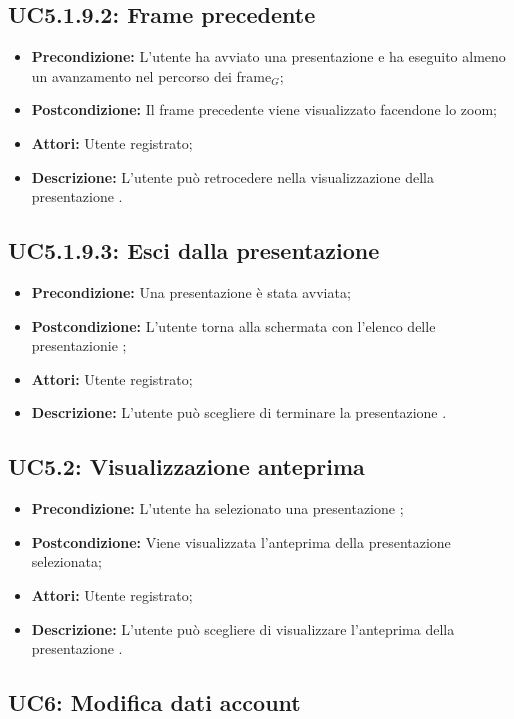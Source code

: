 \subsection{ UC5.1.9.2: Frame precedente}

\begin{itemize}
	\item \textbf{Precondizione:} L'utente ha avviato una presentazione e ha eseguito almeno un avanzamento nel percorso dei frame$_G$;
	\item \textbf{Postcondizione:} Il frame precedente viene visualizzato facendone lo zoom;
	\item \textbf{Attori:} Utente registrato;
	\item \textbf{Descrizione:} L'utente può retrocedere nella visualizzazione della presentazione .
\end{itemize}
\subsection{ UC5.1.9.3: Esci dalla presentazione }

\begin{itemize}
	\item \textbf{Precondizione:} Una presentazione è stata avviata;
	\item \textbf{Postcondizione:} L'utente torna alla schermata con l'elenco delle presentazionie ;
	\item \textbf{Attori:} Utente registrato;
	\item \textbf{Descrizione:} L'utente può scegliere di terminare la presentazione .
\end{itemize}
\subsection{ UC5.2: Visualizzazione anteprima }

\begin{itemize}
	\item \textbf{Precondizione:} L'utente ha selezionato una presentazione ;
	\item \textbf{Postcondizione:} Viene visualizzata l'anteprima della presentazione selezionata;
	\item \textbf{Attori:} Utente registrato;
	\item \textbf{Descrizione:} L'utente può scegliere di visualizzare l'anteprima della presentazione .
\end{itemize}
\subsection{ UC6: Modifica dati account}

